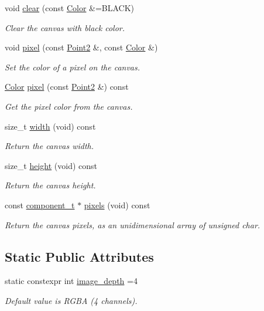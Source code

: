 \begin{DoxyCompactItemize}
void \mbox{\hyperlink{classlife_1_1_canvas_aa8efaeffbb347652940006e5b3e3cac2}{clear}} (const \mbox{\hyperlink{structlife_1_1_color}{Color}} \&=B\+L\+A\+CK)
\begin{DoxyCompactList}\small\item\em Clear the canvas with black color. \end{DoxyCompactList}\item 
void \mbox{\hyperlink{classlife_1_1_canvas_add0ca521248ddabdb6ab11fea8f8012a}{pixel}} (const \mbox{\hyperlink{structlife_1_1_point2}{Point2}} \&, const \mbox{\hyperlink{structlife_1_1_color}{Color}} \&)
\begin{DoxyCompactList}\small\item\em Set the color of a pixel on the canvas. \end{DoxyCompactList}\item 
\mbox{\hyperlink{structlife_1_1_color}{Color}} \mbox{\hyperlink{classlife_1_1_canvas_aa45e2eb2c9fcb732d8a0f748e605b813}{pixel}} (const \mbox{\hyperlink{structlife_1_1_point2}{Point2}} \&) const
\begin{DoxyCompactList}\small\item\em Get the pixel color from the canvas. \end{DoxyCompactList}\item 
size\+\_\+t \mbox{\hyperlink{classlife_1_1_canvas_ad968f24eb984369bdcdcb2cd794f9dd4}{width}} (void) const
\begin{DoxyCompactList}\small\item\em Return the canvas width. \end{DoxyCompactList}\item 
size\+\_\+t \mbox{\hyperlink{classlife_1_1_canvas_ae404ca8fbd5162d3834571106a3edd95}{height}} (void) const
\begin{DoxyCompactList}\small\item\em Return the canvas height. \end{DoxyCompactList}\item 
const \mbox{\hyperlink{classlife_1_1_canvas_aa0de8894cefde751c08728d25e75a911}{component\+\_\+t}} $\ast$ \mbox{\hyperlink{classlife_1_1_canvas_a5078b777fd88aeba6c21e456e945ffaf}{pixels}} (void) const
\begin{DoxyCompactList}\small\item\em Return the canvas pixels, as an unidimensional array of {\ttfamily unsigned char}. \end{DoxyCompactList}\end{DoxyCompactItemize}
\subsection*{Static Public Attributes}
\begin{DoxyCompactItemize}
\item 
static constexpr int \mbox{\hyperlink{classlife_1_1_canvas_a91085de7195ca7c7a016442491dd972a}{image\+\_\+depth}} =4
\begin{DoxyCompactList}\small\item\em Default value is R\+G\+BA (4 channels). \end{DoxyCompactList}\end{DoxyCompactItemize}
